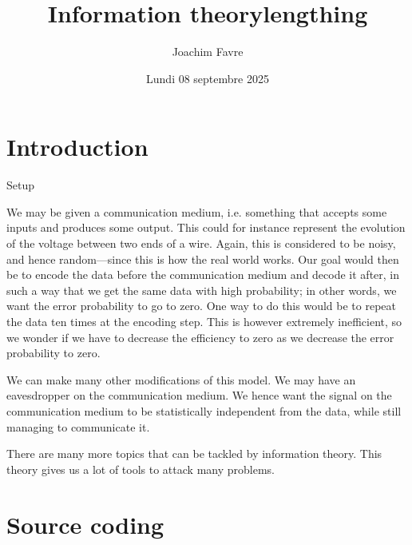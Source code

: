 \documentclass[a4paper]{article}
\title{Information theorylengthing}
\author{Joachim Favre}
\date{Lundi 08 septembre 2025}
\begin{document}
\maketitle


\section{Introduction}

\begin{parag}{Setup}

    We may be given a communication medium, i.e. something that accepts some inputs and produces some output. This could for instance represent the evolution of the voltage between two ends of a wire. Again, this is considered to be noisy, and hence random---since this is how the real world works. Our goal would then be to encode the data before the communication medium and decode it after, in such a way that we get the same data with high probability; in other words, we want the error probability to go to zero. One way to do this would be to repeat the data ten times at the encoding step. This is however extremely inefficient, so we wonder if we have to decrease the efficiency to zero as we decrease the error probability to zero.

    We can make many other modifications of this model. We may have an eavesdropper on the communication medium. We hence want the signal on the communication medium to be statistically independent from the data, while still managing to communicate it.

    There are many more topics that can be tackled by information theory. This theory gives us a lot of tools to attack many problems.

\end{parag}

\section{Source coding}
\end{document}

